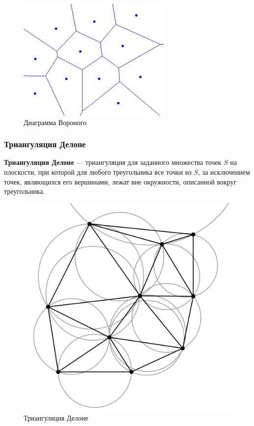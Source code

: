 \begin{figure}[H]
    \centering
    \includegraphics[width=0.75\linewidth]{voronoi-diagram.jpg}
    \caption{Диаграмма Вороного}
\end{figure}

\newpage

\subsubsection*{Триангуляция Делоне}

\textbf{Триангуляция Делоне} — триангуляция для заданного множества точек $S$ на плоскости, при которой для любого треугольника все точки из $S$, за исключением точек, являющихся его вершинами, лежат вне окружности, описанной вокруг треугольника.

\begin{figure}[H]
    \centering
    \includegraphics[width=0.75\linewidth]{delaunay-circumcircles-vectorial.png}
    \caption{Триангуляция Делоне}
\end{figure}

